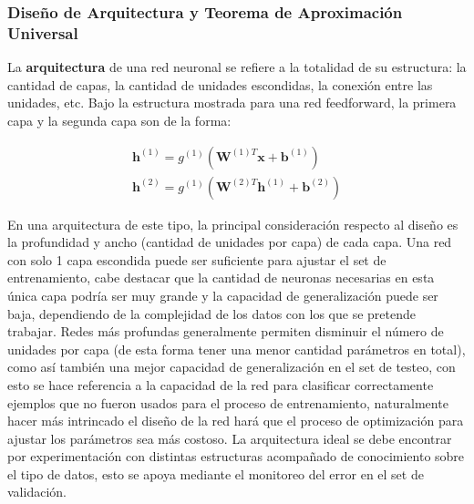 \subsubsection{Dise\~{n}o de Arquitectura y Teorema de Aproximaci\'on Universal}

La \textbf{arquitectura} de una red neuronal se refiere a la totalidad de su estructura: la cantidad de capas, la cantidad de unidades escondidas, la conexi\'on entre las unidades, etc. Bajo la estructura mostrada para una red feedforward, la primera capa y la segunda capa son de la forma:

\begin{equation}
\begin{split}
\bm{h}^{(1)} = g^{(1)}(\bm{W}^{(1) T}\bm{x} + \bm{b}^{(1)}) 
\\
\bm{h}^{(2)} = g^{(1)}(\bm{W}^{(2) T}\bm{h}^{(1)} + \bm{b}^{(2)})
\end{split}
\end{equation}

En una arquitectura de este tipo, la principal consideraci\'on respecto al dise\~{n}o es la profundidad y ancho (cantidad de unidades por capa) de cada capa. Una red con solo 1 capa escondida puede ser suficiente para ajustar el set de entrenamiento, cabe destacar que la cantidad de neuronas necesarias en esta única capa podría ser muy grande y la capacidad de generalización puede ser baja, dependiendo de la complejidad de los datos con los que se pretende trabajar. Redes m\'as profundas generalmente permiten disminuir el n\'umero de unidades por capa (de esta forma tener una menor cantidad par\'ametros en total), como as\'i tambi\'en una mejor capacidad de generalización en el set de testeo, con esto se hace referencia a la capacidad de la red para clasificar correctamente ejemplos que no fueron usados para el proceso de entrenamiento, naturalmente hacer más intrincado el diseño de la red hará que el proceso de optimización para ajustar los parámetros sea más costoso. La arquitectura ideal se debe encontrar por experimentaci\'on con distintas estructuras acompañado de conocimiento sobre el tipo de datos, esto se apoya mediante el monitoreo del error en el set de validaci\'on.

